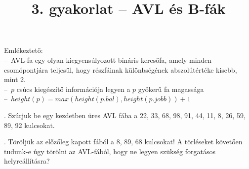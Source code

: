 \documentclass[12pt]{article}
\date{}
\title{3. gyakorlat -- AVL és B-fák}
\begin{document}
\maketitle

\noindent Emlékeztető:\\
--~AVL-fa egy olyan kiegyensúlyozott bináris keresőfa, amely minden csomópontjára teljesül, hogy részfáinak különbségének abszolútértéke kisebb, mint 2.\\
--~$p$ csúcs kiegészítő információja legyen a $p$ gyökerű fa magassága\\
--~$height(p) = max(height(p.bal), height(p.jobb))+1$

\vspace{1.1em}

. Szúrjuk be egy kezdetben üres AVL fába a 22, 33, 68, 98, 91, 44, 11, 8, 26, 59, 89, 92 kulcsokat.

\begin{figure}[!h]
\centering
\end{figure}

. Töröljük az előzőleg kapott fából a 8, 89, 68 kulcsokat! A törléseket követően tudunk-e úgy törölni az AVL-fából, hogy ne legyen szükség forgatásos helyreállításra?
\end{document}
